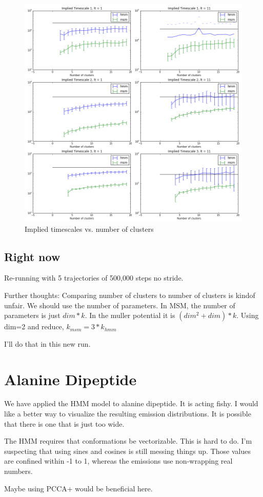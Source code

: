 \documentclass[10pt]{article}
\begin{document}
\begin{figure}[htbp!]
	\centering
	\includegraphics[width=1.0\textwidth]{its_vs_k.png}
	\caption{Implied timescales vs. number of clusters}
	\label{its_vs_k}
\end{figure}

\subsection{Right now}
Re-running with 5 trajectories of 500,000 steps no stride.

Further thoughts: Comparing number of clusters to number of clusters
is kindof unfair. We should use the number of parameters. In MSM, the number
of parameters is just $dim*k$. In the muller potential it is $(dim^2 + dim)*k$.
Using dim=2 and reduce, $k_{msm} = 3*k_{hmm}$

I'll do that in this new run.

\section{Alanine Dipeptide}
We have applied the HMM model to alanine dipeptide. It is acting fishy.
I would like a better way to visualize the resulting emission distributions.
It is possible that there is one that is just too wide.

The HMM requires that conformations be vectorizable. This is hard to do. I'm suspecting
that using sines and cosines is still messing things up. Those values are confined within
-1 to 1, whereas the emissions use non-wrapping real numbers.

Maybe using PCCA+ would be beneficial here.
\end{document}
